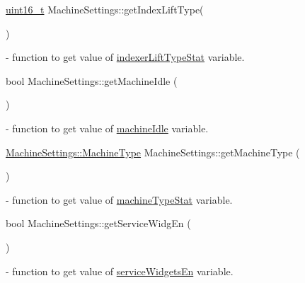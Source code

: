 \mbox{\label{classMachineSettings_acb8ca9e673941dd7abb8c429e9525f2a}} 
{\footnotesize\ttfamily \mbox{\hyperlink{settings_8h_a017dd44e68049ffdd31500a8cd01ba68}{uint16\+\_\+t}} Machine\+Settings\+::\texorpdfstring{get\+Index\+Lift\+Type}{getIndexLiftType}(\begin{DoxyParamCaption}{ }\end{DoxyParamCaption}){\ttfamily [static]}} - function to get value of \hyperlink{classMachineSettings_a358c9d4ed568f50c5279c7019c97ffc2}{indexer\+Lift\+Type\+Stat} variable.

\mbox{\label{classMachineSettings_a232ca3eed7f64a1721e23f1bf3ad9243}} 
{\footnotesize\ttfamily bool Machine\+Settings\+::\texorpdfstring{get\+Machine\+Idle}{getMachineIdle} (\begin{DoxyParamCaption}{ }\end{DoxyParamCaption}){\ttfamily [static]}} - function to get value of \hyperlink{classMachineSettings_a8297d5ccf01292708bc4aae65180a54c}{machine\+Idle} variable.

\mbox{\label{classMachineSettings_a0349f2cb52c9359909722942a831aeae}} 
{\footnotesize\ttfamily \mbox{\hyperlink{classMachineSettings_af95330ff3a80de06fe956f5297ec0fc5}{Machine\+Settings\+::\+Machine\+Type}} Machine\+Settings\+::\texorpdfstring{get\+Machine\+Type}{getMachineType} (\begin{DoxyParamCaption}{ }\end{DoxyParamCaption}){\ttfamily [static]}} - function to get value of \hyperlink{classMachineSettings_ae3167629c7a8723b123ff5616fb284af}{machine\+Type\+Stat} variable.

\mbox{\label{classMachineSettings_aed23d5dfd20513c309956d187e0b7a3b}} 
{\footnotesize\ttfamily bool Machine\+Settings\+::\texorpdfstring{get\+Service\+Widg\+En}{getServiceWidgEn} (\begin{DoxyParamCaption}{ }\end{DoxyParamCaption}){\ttfamily [static]}} - function to get value of \hyperlink{classMachineSettings_a9a8e6bc0e09fa8ac8e32e30cbbd5ef4c}{service\+Widgets\+En} variable.

